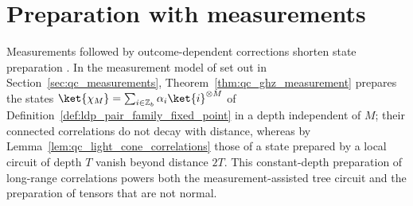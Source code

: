 
\section{Preparation with measurements}\label{sec:ldp_measurements}

Measurements followed by outcome-dependent corrections shorten
state preparation \cite{Malz2024Preparation}. In the measurement model of \cite{Piroli2021LOCC} set out
in Section~\ref{sec:qc_measurements}, Theorem~\ref{thm:qc_ghz_measurement} prepares the states
$\ket{\chi_M}=\sum_{i\in\mathbb Z_b}\alpha_i\ket{i}^{\otimes M}$ of
Definition~\ref{def:ldp_pair_family_fixed_point} in a depth
independent of $M$; their
connected correlations do not decay with distance, whereas by
Lemma~\ref{lem:qc_light_cone_correlations} those of a state prepared by a
local circuit of depth $T$ vanish beyond distance $2T$. This constant-depth preparation of long-range correlations powers both the measurement-assisted tree circuit and the preparation of tensors that are not normal.
